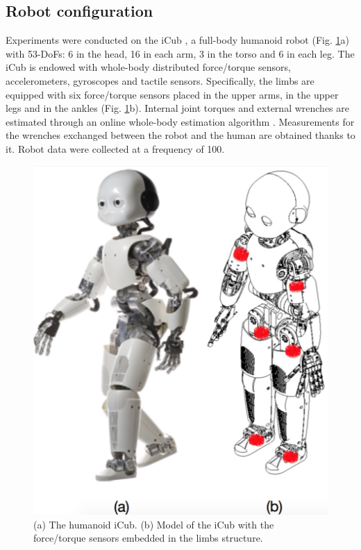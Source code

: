 %
\subsection{Robot configuration}
Experiments were conducted on the iCub \cite{Metta2010}, a full-body humanoid
robot (Fig. \ref{fig:iCub_couple}a) with 53-DoFs: 6 in the head, 16 in each arm, 3 in the
 torso and 6 in each leg. The iCub is endowed with whole-body distributed force/torque sensors,
  accelerometers, gyroscopes and tactile sensors. Specifically, the limbs are equipped with six
   force/torque sensors placed in the upper arms, in the upper legs and in the ankles 
   (Fig. \ref{fig:iCub_couple}b). Internal joint torques and external wrenches are estimated
    through an online whole-body estimation algorithm \cite{Nori2015icub}. Measurements for the
    wrenches exchanged between the robot and the human are obtained thanks to it.  Robot data
	 were collected at a frequency of \unit{100}{\hertz}.
%
\begin{figure}
  \centering
    \includegraphics[width=0.75\columnwidth]{figs/iCub_couple}
  \caption{(a) The humanoid iCub. (b) Model of the iCub with the force/torque 
  sensors embedded in the limbs structure.}
  \label{fig:iCub_couple}
\end{figure}
%

